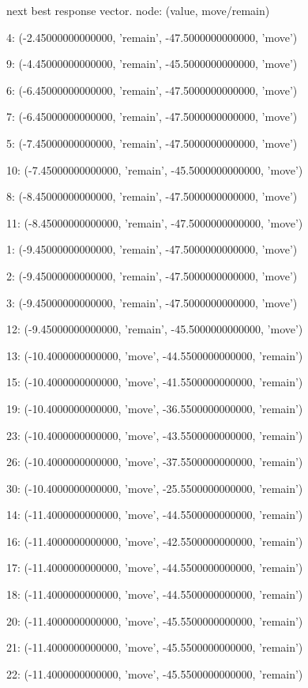  next best response vector.  node: (value, move/remain)


4: (-2.45000000000000, 'remain', -47.5000000000000, 'move')


9: (-4.45000000000000, 'remain', -45.5000000000000, 'move')


6: (-6.45000000000000, 'remain', -47.5000000000000, 'move')


7: (-6.45000000000000, 'remain', -47.5000000000000, 'move')


5: (-7.45000000000000, 'remain', -47.5000000000000, 'move')


10: (-7.45000000000000, 'remain', -45.5000000000000, 'move')


8: (-8.45000000000000, 'remain', -47.5000000000000, 'move')


11: (-8.45000000000000, 'remain', -47.5000000000000, 'move')


1: (-9.45000000000000, 'remain', -47.5000000000000, 'move')


2: (-9.45000000000000, 'remain', -47.5000000000000, 'move')


3: (-9.45000000000000, 'remain', -47.5000000000000, 'move')


12: (-9.45000000000000, 'remain', -45.5000000000000, 'move')


13: (-10.4000000000000, 'move', -44.5500000000000, 'remain')


15: (-10.4000000000000, 'move', -41.5500000000000, 'remain')


19: (-10.4000000000000, 'move', -36.5500000000000, 'remain')


23: (-10.4000000000000, 'move', -43.5500000000000, 'remain')


26: (-10.4000000000000, 'move', -37.5500000000000, 'remain')


30: (-10.4000000000000, 'move', -25.5500000000000, 'remain')


14: (-11.4000000000000, 'move', -44.5500000000000, 'remain')


16: (-11.4000000000000, 'move', -42.5500000000000, 'remain')


17: (-11.4000000000000, 'move', -44.5500000000000, 'remain')


18: (-11.4000000000000, 'move', -44.5500000000000, 'remain')


20: (-11.4000000000000, 'move', -45.5500000000000, 'remain')


21: (-11.4000000000000, 'move', -45.5500000000000, 'remain')


22: (-11.4000000000000, 'move', -45.5500000000000, 'remain')


